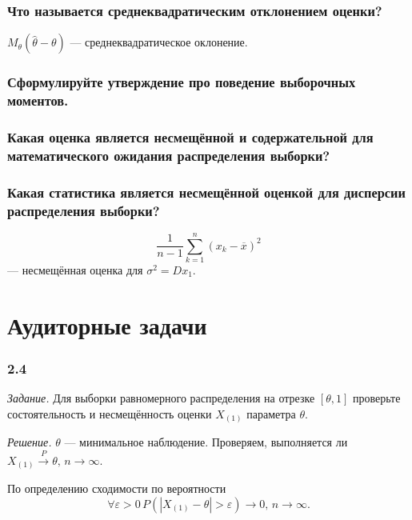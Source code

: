 \subsubsection*{Что называется среднеквадратическим отклонением оценки?}

$M_{ \theta } \left( \hat{ \theta } - \theta \right) $ --- среднеквадратическое оклонение.

\subsubsection*{Сформулируйте утверждение про поведение выборочных моментов.}

\subsubsection*{Какая оценка является несмещённой и содержательной для математического ожидания
                распределения выборки?}

\subsubsection*{Какая статистика является несмещённой оценкой для дисперсии распределения выборки?}

$$ \frac{1}{n - 1} \sum \limits_{k = 1}^n \left( x_k - \overline{x} \right)^2$$
--- несмещённая оценка для $ \sigma^2 = Dx_1$.

\section*{Аудиторные задачи}

\subsubsection*{2.4}

\textit{Задание.}
Для выборки равномерного распределения на отрезке $ \left[ \theta , 1 \right] $
проверьте состоятельность и несмещённость оценки $X_{ \left( 1 \right) }$ параметра $ \theta $.

\textit{Решение.} $ \theta $ --- минимальное наблюдение.
Проверяем,
выполняется ли $X_{ \left( 1 \right) } \overset{P}{ \rightarrow } \theta, \, n \to \infty $.

По определению сходимости по вероятности
$$ \forall \varepsilon > 0 \,
  P \left( \left| X_{ \left( 1 \right) } - \theta \right| > \varepsilon \right) \to 0, \,
  n \to \infty.$$

